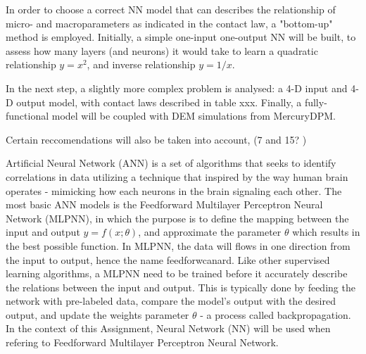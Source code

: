 In order to choose a correct NN model that can describes the relationship of micro- and macroparameters as indicated in the contact law, a "bottom-up" method is employed. Initially, a simple one-input one-output NN will be built, to assess how many layers (and neurons) it would take to learn a quadratic relationship \(y = x^2\), and inverse relationship \(y = 1/x\).

In the next step, a slightly more complex problem is analysed: a 4-D input and 4-D output model, with contact laws described in table xxx. Finally, a fully-functional model will be coupled with DEM simulations from MercuryDPM.   

Certain reccomendations will also be taken into account, (7 and 15? )


Artificial Neural Network (ANN) is a set of algorithms that seeks to identify correlations in data utilizing a technique that inspired by the way human brain operates - mimicking how each neurons in the brain signaling each other. The most basic ANN models is the Feedforward Multilayer Perceptron Neural Network (MLPNN), in which the purpose is to define the mapping between the input and output \(y = f(x;\theta)\), and approximate the parameter \(\theta\) which results in the best possible function. In MLPNN, the data will flows in one direction from the input to output, hence the name feedforwcanard. Like other supervised learning algorithms, a MLPNN need to be trained before it  accurately describe the relations between the input and output. This is typically done by feeding the network with pre-labeled data, compare the model's output with the desired output, and update the weights parameter \(\theta\) - a process called backpropagation. In the context of this Assignment, Neural Network (NN) will be used when refering to Feedforward Multilayer Perceptron Neural Network. 

